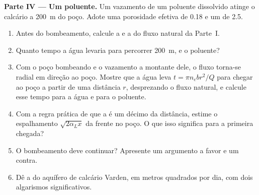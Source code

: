 \begin{problem}
\medskip\noindent\textbf{Parte IV --- Um poluente.} Um vazamento de um poluente dissolvido
atinge o calcário a \qty{200}{m} do poço. Adote uma
porosidade efetiva de 0.18 e um  de 2.5.
\begin{enumerate}[resume]
\item Antes do bombeamento, calcule a  e a  do fluxo natural da Parte~I.
\item Quanto tempo a água levaria para percorrer \qty{200}{m}, e o
  poluente?
\item Com o poço bombeando e o vazamento a montante dele, o fluxo
  torna-se radial em direção ao poço. Mostre que a água leva $t = \pi n_e b
  r^2/Q$ para chegar ao poço a partir de uma distância $r$, desprezando o
  fluxo natural, e calcule esse tempo para a água e para o poluente.
\item Com a regra prática de que a  é um décimo da distância,
  estime o espalhamento $\sqrt{2\alpha_Lx}$ da frente no poço. O que
  isso significa para a primeira chegada?
\item O bombeamento deve continuar? Apresente um argumento a favor e um contra.
\item Dê a  do aquífero de calcário Varden, em metros quadrados
  por dia, com dois algarismos significativos.
\end{enumerate}
\end{problem}
